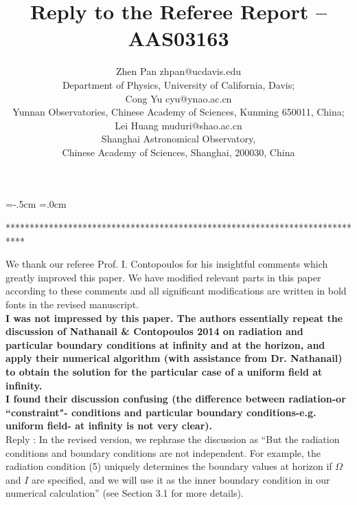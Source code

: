 \topmargin=-.5cm
\textheight=22cm
\oddsidemargin=.0cm
\textwidth=15.8cm
\baselineskip=18pt
\def\be{\begin{equation}}
\def\ee{\end{equation}}
\def\<{\noindent }



\title{\bf
Reply to the Referee Report -- AAS03163 }
\author{Zhen Pan \quad zhpan@ucdavis.edu\\
Department of Physics, University of California, Davis;\\
Cong Yu \quad cyu@ynao.ac.cn\\
Yunnan Observatories, Chinese Academy of Sciences, Kunming 650011, China;\\
Lei Huang \quad muduri@shao.ac.cn\\
Shanghai Astronomical Observatory, \\
Chinese Academy of Sciences, Shanghai, 200030, China}

\maketitle


\<*****************************************************************************

\<We thank our referee Prof. I. Contopoulos for
his insightful comments which greatly improved this paper. We have
modified relevant parts in this paper according to these comments
and all significant modifications are written in bold fonts
in the revised manuscript. \\


{\bf I was not impressed by this paper. The authors essentially repeat
the discussion of Nathanail \& Contopoulos 2014 on radiation and
particular boundary conditions at infinity and at the horizon,
and apply their numerical algorithm (with assistance from Dr. Nathanail)
to obtain the solution for the particular case of a uniform field at infinity.\\

I found their discussion confusing (the difference between radiation-or ``constraint"- conditions
and particular boundary conditions-e.g. uniform field- at infinity is not very clear).}\\

\< Reply : In the revised version,  we rephrase the discussion as
``But the radiation conditions and boundary conditions are not independent.
For example, the radiation condition (5) uniquely determines the boundary values at horizon
if $\Omega$ and $I$ are specified, and we will use it as the inner boundary condition in our numerical calculation''
(see Section 3.1 for more details).\\

